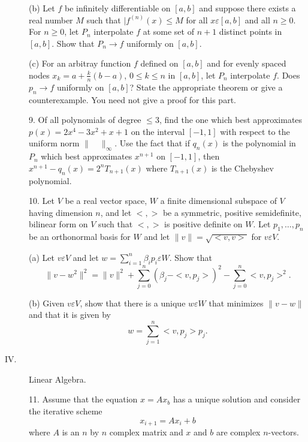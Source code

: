 \documentclass{article}
\begin{document}
\begin{description}
\item[\qquad] (b)
Let $f$ be infinitely differentiable on $[a,b]$ and suppose there exists a
real number $M$ such that $|f^{(n)} (x) \leq M$ for all
$x\varepsilon [a,b]$ and all $n \geq 0$. For $n \geq 0$, let $P_n$
interpolate $f$ at some set of $n+1$ distinct points in
$[a,b]$. Show that $P_n \to f$ uniformly on $[a,b]$.

\item[\qquad] (c)
For an arbitray function $f$ defined on $[a,b]$ and for evenly spaced nodes
$x_k = a + \frac{k}{n} (b-a)$, $0 \leq k \leq n$ in $[a,b]$, let $P_n$
interpolate $f$. Does $p_n \to f$ uniformly on $[a,b]$? State the
appropriate theorem or give a counterexample.
You need not give a proof for this part.

\item[\quad] 9.
Of all polynomials of degree $\leq 3$, find the one which best approximates
$p(x) = 2x^4 - 3x^2 + x+ 1$ on the interval $[-1, 1]$ with respect to the
uniform norm $\parallel \quad \parallel_\infty$. Use the fact that if
$q_n(x)$ is the polynomial in $P_n$ which best approximates
$x^{n+1}$ on $[-1,1]$, then $x^{n+1} - q_n (x) = 2^nT_{n+1} (x)$
where $T_{n+1} (x)$ is the Chebyshev polynomial.

\item[\quad] 10.
Let $V$ be a real vector space, $W$ a finite dimensional subspace of $V$
having dimension $n$, and let $<,>$ be a symmetric, positive semidefinite,
bilinear form on $V$ such that $<,>$ is positive definite on $W$.
Let $p_1, \dots, p_n$ be an orthonormal basis for $W$ and let
$\parallel v \parallel = \sqrt{<v,v>}$ for $v \varepsilon V$.

\item[\quad] (a)
Let $v \varepsilon V$ and let $w = \sum^n_{i=1} \beta_i p_i \varepsilon W$.
Show that
$$\parallel v-w^2 \parallel^2 = \parallel v \parallel^2 + \sum^n_{j=0}
  \left( \beta_j -<v,p_j> \right)^2 - \sum^n_{j=0}
  <v, p_j>^2.$$

\item[\quad] (b)
Given $v\varepsilon V$, show that there is a unique $w \varepsilon W$ that
minimizes $\parallel v-w \parallel$ and that it is given by
$$w = \sum^n_{j=1} <v, p_j>p_j.$$

\item[IV.]
Linear Algebra.

\item[\quad] 11.
Assume that the equation $x=Ax_b$ has a unique solution and consider the
iterative scheme
$$x_{i+1} = Ax_i + b$$
where $A$ is an $n$ by $n$ complex matrix and $x$ and $b$ are complex
$n$-vectors.


\end{description}
\end{document}
